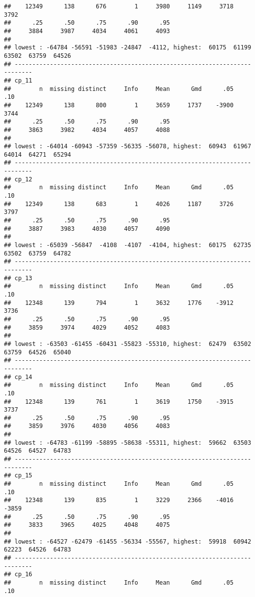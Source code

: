 \documentclass[]{article}
\begin{document}
\begin{verbatim}
##    12349      138      676        1     3980     1149     3718     3792 
##      .25      .50      .75      .90      .95 
##     3884     3987     4034     4061     4093 
## 
## lowest : -64784 -56591 -51983 -24847  -4112, highest:  60175  61199  63502  63759  64526
## ---------------------------------------------------------------------------
## cp_11 
##        n  missing distinct     Info     Mean      Gmd      .05      .10 
##    12349      138      800        1     3659     1737    -3900     3744 
##      .25      .50      .75      .90      .95 
##     3863     3982     4034     4057     4088 
## 
## lowest : -64014 -60943 -57359 -56335 -56078, highest:  60943  61967  64014  64271  65294
## ---------------------------------------------------------------------------
## cp_12 
##        n  missing distinct     Info     Mean      Gmd      .05      .10 
##    12349      138      683        1     4026     1187     3726     3797 
##      .25      .50      .75      .90      .95 
##     3887     3983     4030     4057     4090 
## 
## lowest : -65039 -56847  -4108  -4107  -4104, highest:  60175  62735  63502  63759  64782
## ---------------------------------------------------------------------------
## cp_13 
##        n  missing distinct     Info     Mean      Gmd      .05      .10 
##    12348      139      794        1     3632     1776    -3912     3736 
##      .25      .50      .75      .90      .95 
##     3859     3974     4029     4052     4083 
## 
## lowest : -63503 -61455 -60431 -55823 -55310, highest:  62479  63502  63759  64526  65040
## ---------------------------------------------------------------------------
## cp_14 
##        n  missing distinct     Info     Mean      Gmd      .05      .10 
##    12348      139      761        1     3619     1750    -3915     3737 
##      .25      .50      .75      .90      .95 
##     3859     3976     4030     4056     4083 
## 
## lowest : -64783 -61199 -58895 -58638 -55311, highest:  59662  63503  64526  64527  64783
## ---------------------------------------------------------------------------
## cp_15 
##        n  missing distinct     Info     Mean      Gmd      .05      .10 
##    12348      139      835        1     3229     2366    -4016    -3859 
##      .25      .50      .75      .90      .95 
##     3833     3965     4025     4048     4075 
## 
## lowest : -64527 -62479 -61455 -56334 -55567, highest:  59918  60942  62223  64526  64783
## ---------------------------------------------------------------------------
## cp_16 
##        n  missing distinct     Info     Mean      Gmd      .05      .10 

\end{verbatim}
\end{document}
